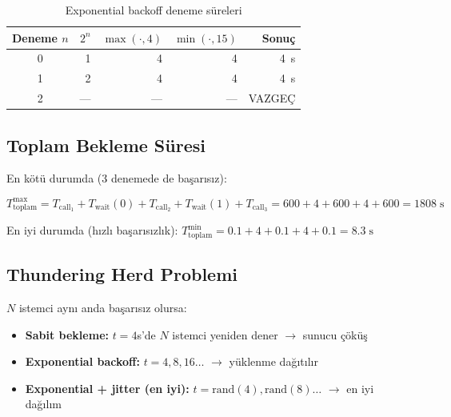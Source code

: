 \begin{table}[H]
\centering
\caption{Exponential backoff deneme s\"{u}releri}
\label{tab:backoff}
\begin{tabularx}{0.8\textwidth}{crrrr}
\toprule
\color{chapterBlue}\textbf{Deneme $n$} & \color{chapterBlue}\textbf{$2^n$} & \color{chapterBlue}\textbf{$\max(\cdot, 4)$} & \color{chapterBlue}\textbf{$\min(\cdot, 15)$} & \color{chapterBlue}\textbf{Sonu\c{c}} \\
\midrule
0 & 1 & 4 & 4  & 4~s \\
1 & 2 & 4 & 4  & 4~s \\
2 & --- & --- & --- & VAZGE\c{C} \\
\bottomrule
\end{tabularx}
\end{table}

\subsection{Toplam Bekleme S\"{u}resi}
\label{sec:total-wait}

En k\"{o}t\"{u} durumda (3 denemede de ba\c{s}ar{\i}s{\i}z):

\begin{equation}
\label{eq:total-wait}
T_{\mathrm{toplam}}^{\max} = T_{\mathrm{call}_1} + T_{\mathrm{wait}}(0) + T_{\mathrm{call}_2} + T_{\mathrm{wait}}(1) + T_{\mathrm{call}_3} = 600 + 4 + 600 + 4 + 600 = 1808\;\text{s}
\end{equation}

En iyi durumda (h{\i}zl{\i} ba\c{s}ar{\i}s{\i}zl{\i}k):
$T_{\mathrm{toplam}}^{\min} = 0.1 + 4 + 0.1 + 4 + 0.1 = 8.3\;\text{s}$

\subsection{Thundering Herd Problemi}
\label{sec:thundering-herd}

$N$ istemci ayn{\i} anda ba\c{s}ar{\i}s{\i}z olursa:

\begin{itemize}
  \item \textbf{Sabit bekleme:} $t=4$s'de $N$ istemci yeniden dener $\to$ sunucu \c{c}\"{o}k\"{u}\c{s}
  \item \textbf{Exponential backoff:} $t=4, 8, 16\ldots$ $\to$ y\"{u}klenme da\u{g}{\i}t{\i}l{\i}r
  \item \textbf{Exponential + jitter (en iyi):} $t=\text{rand}(4), \text{rand}(8)\ldots$ $\to$ en iyi da\u{g}{\i}l{\i}m
\end{itemize}

